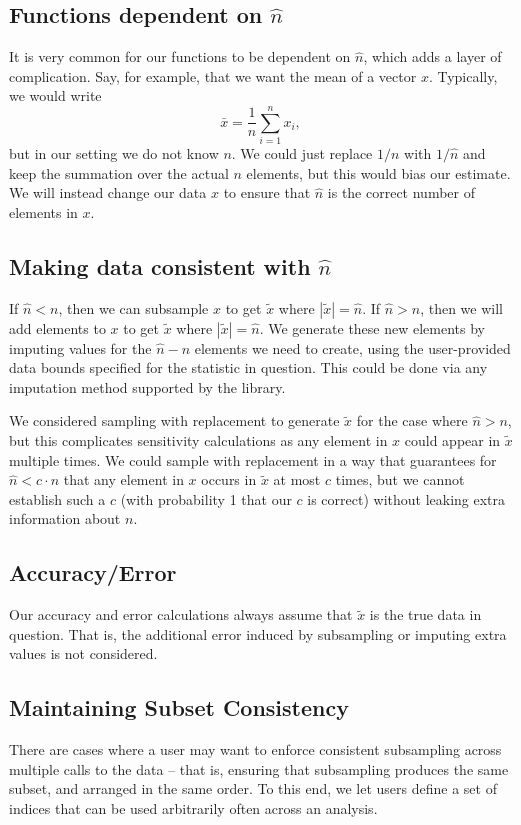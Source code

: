 \documentclass[11pt]{scrartcl} %
\begin{document}
\subsection{Functions dependent on $\hat{n}$}
It is very common for our functions to be dependent on $\hat{n}$, which adds a layer of complication.
Say, for example, that we want the mean of a vector $x$. Typically, we would write
\[ \bar{x} = \frac{1}{n} \sum_{i=1}^{n} x_i, \]
but in our setting we do not know $n$. We could just replace $1/n$ with $1/\hat{n}$ and keep
the summation over the actual $n$ elements, but this would bias our estimate.
We will instead change our data $x$ to ensure that $\hat{n}$ is the correct number of elements in $x$.

\subsection{Making data consistent with $\hat{n}$}
If $\hat{n} < n$, then we can subsample $x$ to get $\tilde{x}$ where $|\tilde{x}| = \hat{n}$. \newline
If $\hat{n} > n$, then we will add elements to $x$ to get $\tilde{x}$ where $|\tilde{x}| = \hat{n}$. \newline
We generate these new elements by imputing values for the $\hat{n} - n$ elements we need to create, using
the user-provided data bounds specified for the statistic in question.
This could be done via any imputation method supported by the library.

We considered sampling with replacement to generate $\tilde{x}$ for the case where $\hat{n} > n$,
but this complicates sensitivity calculations as any element in $x$ could appear in $\tilde{x}$ multiple times.
We could sample with replacement in a way that guarantees for $\hat{n} < c \cdot n$ that any element in
$x$ occurs in $\tilde{x}$ at most $c$ times, but we cannot establish such a $c$ (with probability 1 that our
$c$ is correct) without leaking extra information about $n$.

\subsection{Accuracy/Error}
Our accuracy and error calculations always assume that $\tilde{x}$ is the true data in question.
That is, the additional error induced by subsampling or imputing extra values is not considered.

\subsection{Maintaining Subset Consistency}
There are cases where a user may want to enforce consistent subsampling across multiple calls to the data --
that is, ensuring that subsampling produces the same subset, and arranged in the same order.
To this end, we let users define a set of indices that can be used arbitrarily often across an analysis.
\end{document}
